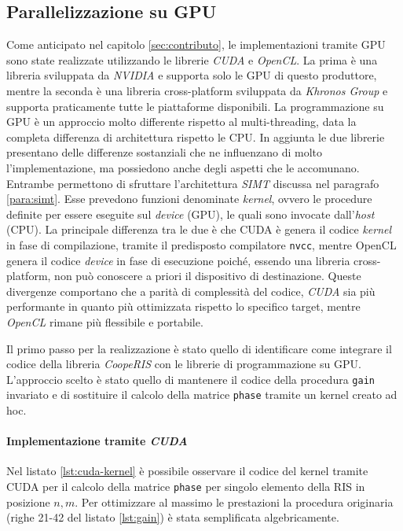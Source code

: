 \subsection{Parallelizzazione su GPU}
\label{subsec:cuda}

Come anticipato nel capitolo \ref{sec:contributo}, le implementazioni tramite
GPU sono state realizzate utilizzando le librerie \textit{CUDA}\cite{cuda} e
\textit{OpenCL}\cite{opencl}. La prima è una libreria sviluppata da \textit{NVIDIA}
e supporta solo le GPU di questo produttore, mentre la seconda è una libreria cross-platform
sviluppata da \textit{Khronos Group} e supporta praticamente tutte le
piattaforme disponibili. La programmazione su GPU è un approccio molto differente
rispetto al multi-threading, data la completa differenza di architettura
rispetto le CPU. In aggiunta le due librerie presentano delle differenze sostanziali
che ne influenzano di molto l'implementazione, ma possiedono anche degli aspetti
che le accomunano. Entrambe permettono di sfruttare l'architettura \textit{SIMT}
discussa nel paragrafo \ref{para:simt}. Esse prevedono funzioni denominate \textit{kernel},
ovvero le procedure definite per essere eseguite sul \textit{device} (GPU), le quali
sono invocate dall'\textit{host} (CPU). La principale differenza tra le due è che
CUDA è genera il codice \textit{kernel} in fase di compilazione, tramite il predisposto
compilatore \texttt{nvcc}, mentre OpenCL genera il codice \textit{device} in
fase di esecuzione poiché, essendo una libreria cross-platform, non può
conoscere a priori il dispositivo di destinazione. Queste divergenze comportano che
a parità di complessità del codice, \textit{CUDA} sia più performante in quanto più
ottimizzata rispetto lo specifico target, mentre \textit{OpenCL} rimane più flessibile
e portabile. \cite{cudavsopencl}

Il primo passo per la realizzazione è stato quello di identificare come integrare
il codice della libreria \textit{CoopeRIS} con le librerie di programmazione su
GPU. L'approccio scelto è stato quello di mantenere il codice della procedura \texttt{gain}
invariato e di sostituire il calcolo della matrice \texttt{phase} tramite un kernel
creato ad hoc.

\paragraph{Implementazione tramite \textit{CUDA}}
\label{para:cuda}

Nel listato \ref{lst:cuda-kernel} è possibile osservare il codice del kernel tramite
CUDA per il calcolo della matrice \texttt{phase} per singolo elemento della RIS
in posizione $n, m$. Per ottimizzare al massimo le prestazioni la procedura originaria
(righe 21-42 del listato \ref{lst:gain}) è stata semplificata algebricamente.

